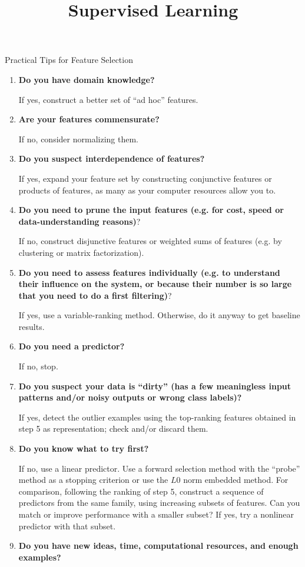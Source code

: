 \documentclass[11pt,compress,t,notes=noshow, xcolor=table]{beamer}
\title{Supervised Learning}
\date{}
\begin{document}


  \begin{vbframe}{Practical Tips for Feature Selection}

    \begin{enumerate}
      \item {\bf Do you have domain knowledge?}

        If yes, construct a better set of \enquote{ad hoc} features.
      \item {\bf Are your features commensurate?}

        If no, consider normalizing them.
      \item {\bf Do you suspect interdependence of features?}

      If yes, expand your feature set by constructing conjunctive features or products of features, as many as your computer resources allow you to.
      \item {\bf Do you need to prune the input features (e.g. for cost, speed or data-understanding reasons)}?

      If no, construct disjunctive features or weighted sums of features (e.g. by clustering or matrix factorization).
      \item {\bf Do you need to assess features individually (e.g. to understand their influence on the system, or because their number is so large that you need to do a first filtering)}?

      If yes, use a variable-ranking method.
      Otherwise, do it anyway to get baseline results.
      \item {\bf Do you need a predictor?}

      If no, stop.
      \item {\bf Do you suspect your data is \enquote{dirty} (has a few meaningless input patterns and/or noisy outputs or wrong class labels)?}

      If yes, detect the outlier examples using the top-ranking features obtained in step 5 as representation; check and/or discard them.
      \item {\bf Do you know what to try first?}

      If no, use a linear predictor.
      Use a forward selection method with the \enquote{probe} method as a stopping criterion or use the $L0$ norm embedded method.
      For comparison, following the ranking of step 5, construct a sequence of predictors from the same family, using increasing subsets of features.
      Can you match or improve performance with a smaller subset?
      If yes, try a nonlinear predictor with that subset.
      \item {\bf Do you have new ideas, time, computational resources, and enough examples?}


\end{enumerate}
\end{vbframe}
\end{document}
